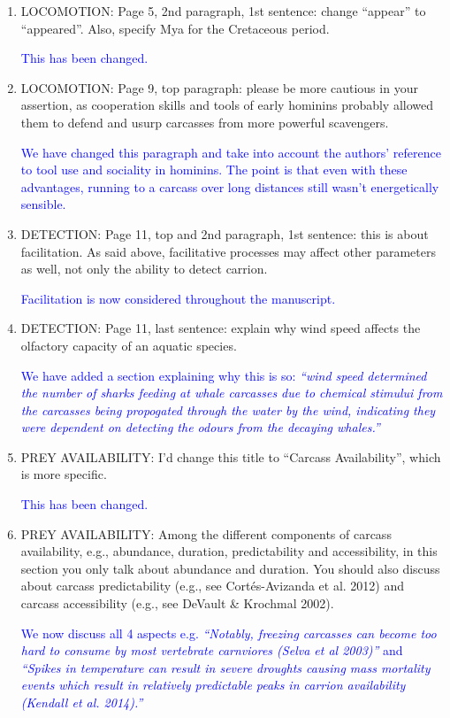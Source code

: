 \documentclass[12pt,letterpaper]{article}
\begin{document}
{\begin{enumerate}
\item{LOCOMOTION:} Page 5, 2nd paragraph, 1st sentence: change ``appear'' to ``appeared''. Also, specify Mya for the Cretaceous period.

\textcolor{blue}{This has been changed.}

\item{LOCOMOTION:} Page 9, top paragraph: please be more cautious in your assertion, as cooperation skills and tools of early hominins probably allowed them to defend and usurp carcasses from more powerful scavengers.

\textcolor{blue}{We have changed this paragraph and take into account the authors' reference to tool use and sociality in hominins. The point is that even with these advantages, running to a carcass over long distances still wasn't energetically sensible.}

\item{DETECTION:} Page 11, top and 2nd paragraph, 1st sentence: this is about facilitation. As said above, facilitative processes may affect other parameters as well, not only the ability to detect carrion.

\textcolor{blue}{Facilitation is now considered throughout the manuscript.}

\item{DETECTION:} Page 11, last sentence: explain why wind speed affects the olfactory capacity of an aquatic species.

\textcolor{blue}{We have added a section explaining why this is so: \textit{``wind speed determined the number of sharks feeding at whale carcasses due to chemical stimului from the carcasses being propogated through the water by the wind, indicating they were dependent on detecting the odours from the decaying whales.''}}

\item{PREY AVAILABILITY:} I'd change this title to ``Carcass Availability'', which is more specific.

\textcolor{blue}{This has been changed.}

\item{PREY AVAILABILITY:} Among the different components of carcass availability, e.g., abundance, duration, predictability and accessibility, in this section you only talk about abundance and duration. You should also discuss about carcass predictability (e.g., see Cort\'{e}s-Avizanda et al. 2012) and carcass accessibility (e.g., see DeVault \& Krochmal 2002).

\textcolor{blue}{We now discuss all 4 aspects e.g. \textit{``Notably, freezing carcasses can become too hard to consume by most vertebrate carnviores (Selva et al 2003)''} and \textit{``Spikes in temperature can result in severe droughts causing mass mortality events which result in relatively predictable peaks in carrion availability (Kendall et al. 2014).''}}



\end{enumerate}}
\end{document}

